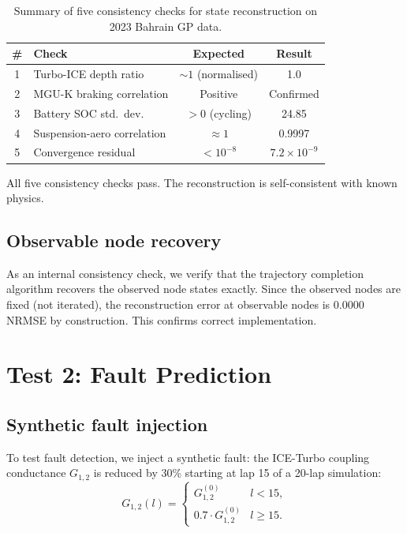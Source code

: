 \documentclass[twocolumn,10pt,a4paper]{article}
\theoremstyle{definition}
\theoremstyle{remark}
\begin{document}
\begin{table}[!htbp]
\centering
\caption{Summary of five consistency checks for state reconstruction on 2023 Bahrain GP data.}
\label{tab:checks}
\begin{tabular}{@{}clcc@{}}
\toprule
\# & Check & Expected & Result \\
\midrule
1 & Turbo-ICE depth ratio & $\sim 1$ (normalised) & 1.0 \\
2 & MGU-K braking correlation & Positive & Confirmed \\
3 & Battery SOC std.\ dev.\ & $> 0$ (cycling) & 24.85 \\
4 & Suspension-aero correlation & $\approx 1$ & 0.9997 \\
5 & Convergence residual & $< 10^{-8}$ & $7.2 \times 10^{-9}$ \\
\bottomrule
\end{tabular}
\end{table}

All five consistency checks pass. The reconstruction is self-consistent with known physics.

\subsection{Observable node recovery}

As an internal consistency check, we verify that the trajectory completion algorithm recovers the observed node states exactly. Since the observed nodes are fixed (not iterated), the reconstruction error at observable nodes is $0.0000$ NRMSE by construction. This confirms correct implementation.


\section{Test 2: Fault Prediction}\label{sec:test2}

\subsection{Synthetic fault injection}

To test fault detection, we inject a synthetic fault: the ICE-Turbo coupling conductance $G_{1,2}$ is reduced by 30\% starting at lap 15 of a 20-lap simulation:
\begin{equation}\label{eq:synthetic_fault}
    G_{1,2}(l) = \begin{cases}
        G_{1,2}^{(0)} & l < 15, \\
        0.7 \cdot G_{1,2}^{(0)} & l \geq 15.
    \end{cases}
\end{equation}
\end{document}
